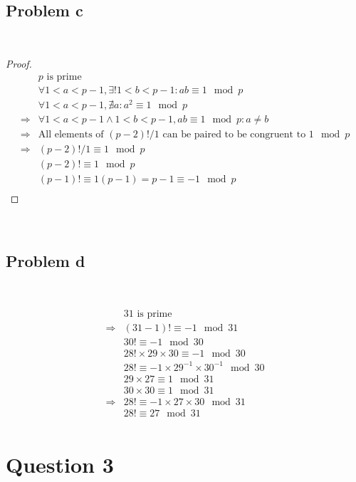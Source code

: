 \documentclass{article}
\begin{document}
~

\subsection*{Problem c}

~

\begin{proof}
    \begin{align*}
        &p\text{ is prime}\\
        &\forall 1<a<p-1,\exists! 1<b<p-1:ab\equiv 1\mod p\\
        &\forall 1<a<p-1,\nexists a:a^2\equiv 1\mod p\\
        \Rightarrow&\forall 1<a<p-1\land 1<b<p-1,ab\equiv 1\mod p:a\ne b\\
        \Rightarrow&\text{All elements of }(p-2)!/1\text{ can be paired to be congruent to }1\mod p\\
        \Rightarrow&(p-2)!/1\equiv 1\mod p\\
        &(p-2)!\equiv 1\mod p\\
        &(p-1)!\equiv 1(p-1)=p-1\equiv -1\mod p\\
    \end{align*}
\end{proof}

~

\subsection*{Problem d}

~

\begin{align*}
    &31\text{ is prime}\\
    \Rightarrow&(31-1)!\equiv -1\mod 31\\
    &30!\equiv -1\mod 30\\
    &28!\times 29\times 30\equiv -1\mod 30\\
    &28!\equiv -1\times 29^{-1}\times 30^{-1}\mod 30\\
    &29\times 27\equiv 1\mod 31\\
    &30\times 30\equiv 1\mod 31\\
    \Rightarrow&28!\equiv -1\times 27\times 30\mod31\\
    &28!\equiv 27\mod 31\\
\end{align*}

\newpage

\section*{Question 3}
\end{document}
